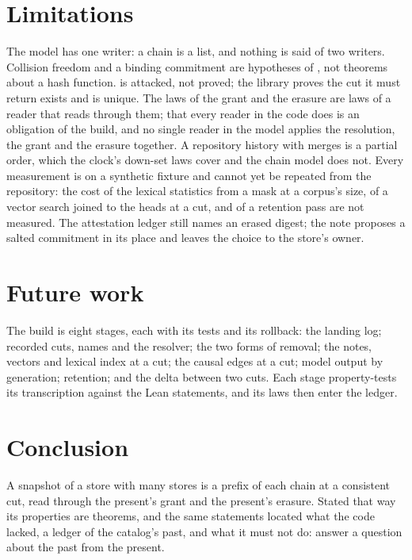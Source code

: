 \documentclass[11pt]{article}
\theoremstyle{plain}
\theoremstyle{definition}
\begin{document}
\section{Limitations}

The model has one writer: a chain is a list, and nothing is said of two writers. Collision
freedom and a binding commitment are hypotheses of , not theorems about a hash
function.  is attacked, not proved; the library proves the cut it must return
exists and is unique. The laws of the grant and the erasure are laws of a reader that reads
through them; that every reader in the code does is an obligation of the build, and no single
reader in the model applies the resolution, the grant and the erasure together. A
repository history with merges is a partial order, which the clock's down-set laws cover and
the chain model does not. Every measurement is on a synthetic fixture and cannot yet be repeated from the
repository: the cost of the lexical statistics from a mask at a corpus's size, of a vector
search joined to the heads at a cut, and of a retention pass are not measured. The attestation
ledger still names an erased digest; the note proposes a salted commitment in its place and
leaves the choice to the store's owner.

\section{Future work}

The build is eight stages, each with its tests and its rollback: the landing log;
recorded cuts, names and the resolver; the two forms of removal; the notes, vectors and
lexical index at a cut; the causal edges at a cut; model output by generation; retention; and
the delta between two cuts. Each stage property-tests its transcription against the Lean
statements, and its laws then enter the ledger.

\section{Conclusion}

A snapshot of a store with many stores is a prefix of each chain at a consistent cut, read
through the present's grant and the present's erasure. Stated that way its properties are
theorems, and the same statements located what the code lacked, a ledger of the catalog's past,
and what it must not do: answer a question about the past from the present.



\end{document}
